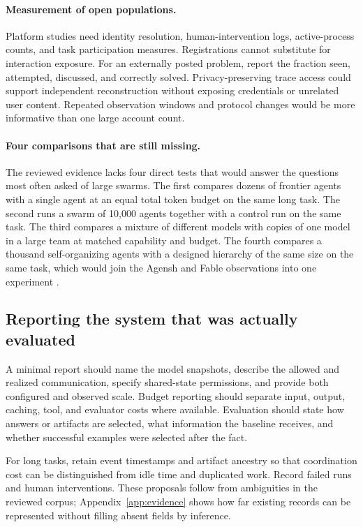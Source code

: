 \paragraph{Measurement of open populations.}
Platform studies need identity resolution, human-intervention logs, active-process counts, and task participation measures. Registrations cannot substitute for interaction exposure. For an externally posted problem, report the fraction seen, attempted, discussed, and correctly solved. Privacy-preserving trace access could support independent reconstruction without exposing credentials or unrelated user content. Repeated observation windows and protocol changes would be more informative than one large account count.

\paragraph{Four comparisons that are still missing.}
The reviewed evidence lacks four direct tests that would answer the questions most often asked of large swarms. The first compares dozens of frontier agents with a single agent at an equal total token budget on the same long task. The second runs a swarm of 10,000 agents together with a control run on the same task. The third compares a mixture of different models with copies of one model in a large team at matched capability and budget. The fourth compares a thousand self-organizing agents with a designed hierarchy of the same size on the same task, which would join the Agensh and Fable observations into one experiment \citep{agensh-1024,anthropic-fable-team-scaling}.

\subsection{Reporting the system that was actually evaluated}
A minimal report should name the model snapshots, describe the allowed and realized communication, specify shared-state permissions, and provide both configured and observed scale. Budget reporting should separate input, output, caching, tool, and evaluator costs where available. Evaluation should state how answers or artifacts are selected, what information the baseline receives, and whether successful examples were selected after the fact.

For long tasks, retain event timestamps and artifact ancestry so that coordination cost can be distinguished from idle time and duplicated work. Record failed runs and human interventions. These proposals follow from ambiguities in the reviewed corpus; Appendix~\ref{app:evidence} shows how far existing records can be represented without filling absent fields by inference.

